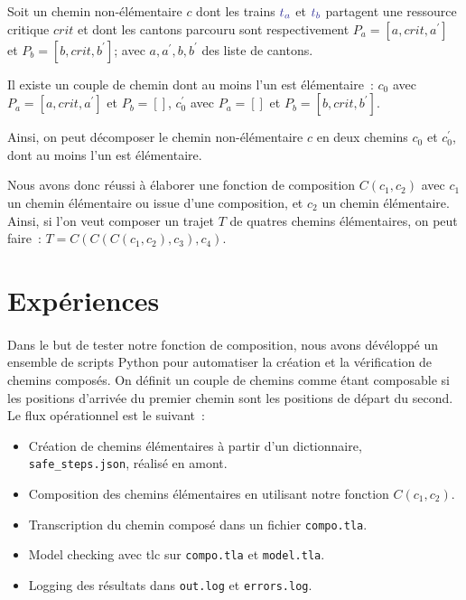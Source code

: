 \documentclass[oneside, a4paper, 11pt]{book}
\newcommand{\trainFmt}[1]{{\color{traincolor} #1}}
\newcommand{\tid}[1]{\ensuremath{\trainFmt{t_{#1}}}}
\begin{document}
\begin{example}
	Soit un chemin non-élémentaire $c$ dont les trains \tid{a} et \tid{b} partagent une ressource critique $crit$ et dont les cantons parcouru sont respectivement $P_a = [a,crit,a^\prime]$ et $ P_b = [b,crit,b^\prime]$; avec $a,a^\prime,b,b^\prime$ des liste de cantons.

	Il existe un couple de chemin dont au moins l'un est élémentaire~: $c_0$ avec $P_a = [a,crit,a^\prime]$ et $P_b = []$, $c_0^\prime$ avec $P_a = []$ et $P_b = [b,crit,b^\prime]$.

	Ainsi, on peut décomposer le chemin non-élémentaire $c$ en deux chemins $c_0$ et $c_0^\prime$, dont au moins l'un est élémentaire.
\end{example}

Nous avons donc réussi à élaborer une fonction de composition $C(c_1,c_2)$ avec $c_1$ un chemin élémentaire ou issue d'une composition, et $c_2$ un chemin élémentaire. Ainsi, si l'on veut composer un trajet $T$ de quatres chemins élémentaires, on peut faire~: $T=C(C(C(c_1,c_2),c_3),c_4)$.

\section{Expériences}
\label{sec:experiences}

\paragraph{}
Dans le but de tester notre fonction de composition, nous avons dévéloppé un ensemble de scripts Python pour automatiser la création et la vérification de chemins composés.
On définit un couple de chemins comme étant composable si les positions d'arrivée du premier chemin sont les positions de départ du second. Le flux opérationnel est le suivant~:
\begin{itemize}
	\item Création de chemins élémentaires à partir d'un dictionnaire, \texttt{safe\_steps.json}, réalisé en amont.
	\item Composition des chemins élémentaires en utilisant notre fonction $C(c_1,c_2)$.
	\item Transcription du chemin composé dans un fichier \texttt{compo.tla}.
	\item Model checking avec tlc sur \texttt{compo.tla} et \texttt{model.tla}.
	\item Logging des résultats dans \texttt{out.log} et \texttt{errors.log}.
\end{itemize}
\end{document}
